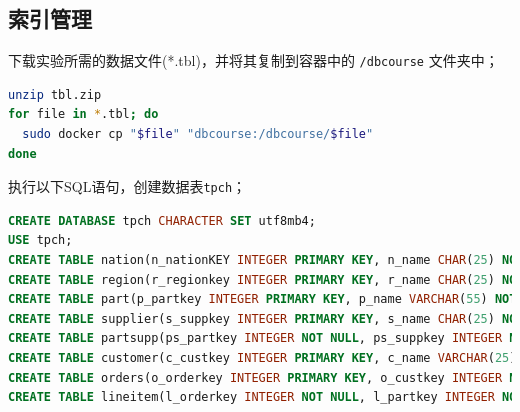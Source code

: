 \documentclass{article}
\renewcommand\tt{\texttt}
\begin{document}
\subsection{索引管理}

下载实验所需的数据文件(*.tbl)，并将其复制到容器中的 \tt{/dbcourse} 文件夹中；

\begin{lstlisting}[language=bash]
unzip tbl.zip
for file in *.tbl; do
  sudo docker cp "$file" "dbcourse:/dbcourse/$file"
done
\end{lstlisting}

执行以下SQL语句，创建数据表\tt{tpch}；

\begin{lstlisting}[language=sql]
CREATE DATABASE tpch CHARACTER SET utf8mb4;
USE tpch;
CREATE TABLE nation(n_nationKEY INTEGER PRIMARY KEY, n_name CHAR(25) NOT NULL, n_regionkey INTEGER NOT NULL, n_comment VARCHAR(152));
CREATE TABLE region(r_regionkey INTEGER PRIMARY KEY, r_name CHAR(25) NOT NULL, r_comment VARCHAR(152));
CREATE TABLE part(p_partkey INTEGER PRIMARY KEY, p_name VARCHAR(55) NOT NULL, p_mfgr CHAR(25) NOT NULL, p_brand CHAR(10) NOT NULL, p_type VARCHAR(25) NOT NULL, p_size INTEGER NOT NULL, p_container CHAR(10) NOT NULL, p_retailprice DECIMAL(15,2) NOT NULL, p_comment VARCHAR(23) NOT NULL);
CREATE TABLE supplier(s_suppkey INTEGER PRIMARY KEY, s_name CHAR(25) NOT NULL, s_address VARCHAR(40) NOT NULL, s_nationkey INTEGER NOT NULL, s_phone CHAR(15) NOT NULL, s_acctbal DECIMAL(15,2) NOT NULL, s_comment VARCHAR(101) NOT NULL);
CREATE TABLE partsupp(ps_partkey INTEGER NOT NULL, ps_suppkey INTEGER NOT NULL, ps_availqty INTEGER NOT NULL, ps_supplycost DECIMAL(15,2) NOT NULL, ps_comment VARCHAR(199) NOT NULL, PRIMARY KEY (ps_partkey, ps_suppkey) );
CREATE TABLE customer(c_custkey INTEGER PRIMARY KEY, c_name VARCHAR(25) NOT NULL, c_address VARCHAR(40) NOT NULL, c_nationkey INTEGER NOT NULL, c_phone CHAR(15) NOT NULL, c_acctbal DECIMAL(15,2) NOT NULL, c_mktsegment CHAR(10) NOT NULL, c_comment VARCHAR(117) NOT NULL);
CREATE TABLE orders(o_orderkey INTEGER PRIMARY KEY, o_custkey INTEGER NOT NULL, o_orderstatus CHAR(1) NOT NULL, o_totalprice DECIMAL(15,2) NOT NULL, o_orderdate date NOT NULL, o_orderpriority CHAR(15) NOT NULL, o_clerk CHAR(15) NOT NULL, o_shippriority INTEGER NOT NULL, o_comment VARCHAR(79) NOT NULL);
CREATE TABLE lineitem(l_orderkey INTEGER NOT NULL, l_partkey INTEGER NOT NULL, l_suppkey INTEGER NOT NULL, l_linenumber INTEGER NOT NULL, l_quantity DECIMAL(15,2) NOT NULL, l_extendedprice DECIMAL(15,2) NOT NULL, l_discount DECIMAL(15,2) NOT NULL, l_tax DECIMAL(15,2) NOT NULL, l_returnflag CHAR(1) NOT NULL, l_linestatus CHAR(1) NOT NULL, l_shipdate date NOT NULL, l_commitdate date NOT NULL, l_receiptdate date NOT NULL, l_shipinstruct CHAR(25) NOT NULL, l_shipmode CHAR(10) NOT NULL, l_comment VARCHAR(44) NOT NULL, PRIMARY KEY(l_orderkey,l_linenumber));
\end{lstlisting}
\end{document}
